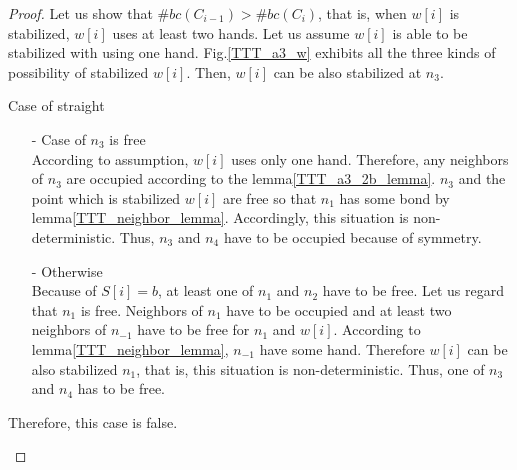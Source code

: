 \begin{proof}
Let us show that $\#bc(C_{i-1}) > \#bc(C_i)$, that is, when $w[i]$ is stabilized, $w[i]$ uses at least two hands.
Let us assume $w[i]$ is able to be stabilized with using one hand. Fig.\ref{TTT_a3_w} exhibits all the three kinds of possibility of stabilized $w[i]$. Then, $w[i]$ can be also stabilized at $n_3$. 

\begin{paragraph}{Case of straight}
\begin{itemize}
\item[-] Case of $n_3$ is free\\
According to assumption, $w[i]$ uses only one hand. Therefore, any neighbors of $n_3$ are occupied according to the lemma\ref{TTT_a3_2b_lemma}. $n_3$ and the point which is stabilized $w[i]$ are free so that $n_1$ has some bond by lemma\ref{TTT_neighbor_lemma}. Accordingly, this situation is non-deterministic. Thus, $n_3$ and $n_4$ have to be occupied because of symmetry.

\item[-] Otherwise\\
Because of  $S[i] = b$, at least one of $n_1$ and $n_2$ have to be free. Let us regard that $n_1$ is free. Neighbors of $n_1$ have to be occupied and at least two neighbors of $n_{-1}$ have to be free for $n_1$ and $w[i]$. According to lemma\ref{TTT_neighbor_lemma}, $n_{-1}$ have some hand. Therefore $w[i]$ can be also stabilized $n_1$, that is, this situation is non-deterministic. Thus, one of $n_3$ and $n_4$ has to be free.
\end{itemize}

Therefore, this case is false.
\end{paragraph}


\end{proof}
